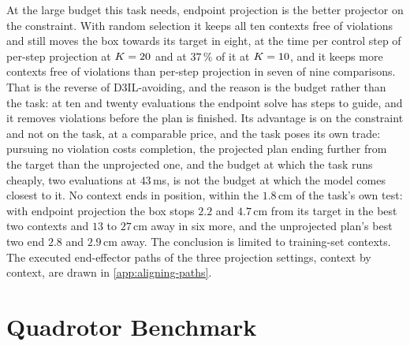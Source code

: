 At the large budget this task needs, endpoint projection is the better projector on the constraint. With
random selection it keeps all ten contexts free of violations and still moves the box towards its target in
eight, at the time per control step of per-step projection at $K=20$ and at $37\,\%$ of it at $K=10$, and
it keeps more contexts free of violations than per-step projection in seven of nine comparisons. That is the reverse of D3IL-avoiding,
and the reason is the budget rather than the task: at ten and twenty evaluations the endpoint solve has steps
to guide, and it removes violations before the plan is finished. Its advantage is on the constraint and not on
the task, at a comparable price, and the task poses its own trade: pursuing no violation costs completion, the
projected plan ending further from the target than the unprojected one, and the budget at which the task runs
cheaply, two evaluations at $43$\,ms, is not the budget at which the model comes closest to it. No context ends
in position, within the $1.8$\,cm of the task's own test: with endpoint projection the box stops $2.2$ and
$4.7$\,cm from its target in the best two contexts and $13$ to $27$\,cm away in six more, and the unprojected plan's
best two end $2.8$ and $2.9$\,cm away. The conclusion is limited to training-set contexts. The executed end-effector paths of the three projection settings, context by
context, are drawn in \autoref{app:aligning-paths}.

\section{Quadrotor Benchmark}\label{sec:res:uav}

